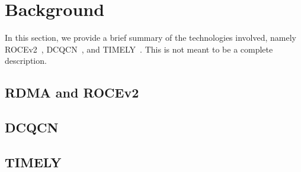\section{Background}
In this section, we provide a brief summary of the technologies involved, namely
ROCEv2~\cite{xxx}, DCQCN~\cite{dcqcn}, and TIMELY~\cite{timely}. This is not
meant to be a complete description.

\subsection{RDMA and ROCEv2}

\subsection{DCQCN}

\subsection{TIMELY}
